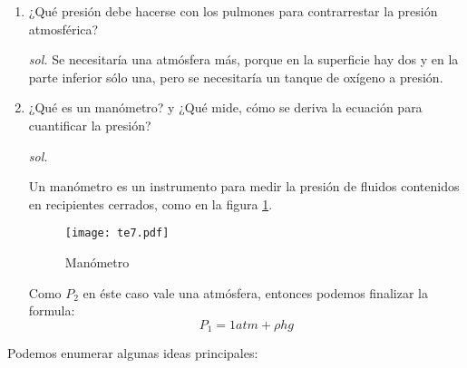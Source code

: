 \begin{enumerate}
    \item  ¿Qué presión debe hacerse con los pulmones para contrarrestar la presión atmosférica?
    
    \textit{sol. }
    Se necesitaría una atmósfera más, porque en la superficie hay dos y en la parte inferior sólo una, pero se necesitaría un tanque de oxígeno a presión.
    \item  ¿Qué es un manómetro? y ¿Qué mide, cómo se deriva la ecuación para cuantificar la presión?
    
    \textit{sol. }
    
    Un manómetro es un instrumento para medir la presión de fluidos contenidos en recipientes cerrados, como en la figura \ref{te7}.
    
    
    \begin{figure}[h!]
      \centering
      \texttt{[image: te7.pdf]}
      \caption{Manómetro}
      \label{te7}
    \end{figure}
    
    Como $P_2$ en éste caso vale una atmósfera, entonces podemos finalizar la formula:
    \begin{equation}
        P_1=1atm+\rho hg
    \end{equation}
\end{enumerate}

Podemos enumerar algunas ideas principales:


